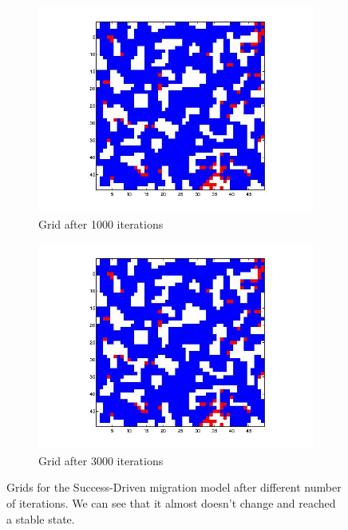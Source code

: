 \documentclass[11pt]{article}
\begin{document}
\begin{figure}
	\centering
	\begin{subfigure}[t]{0.4\textwidth}
        \includegraphics[width=\textwidth]{../../other/grids/m2-t1000.jpg}
	\caption{Grid after 1000 iterations}
    	\end{subfigure}
	\begin{subfigure}[t]{0.4\textwidth}
        \includegraphics[width=\textwidth]{../../other/grids/m2-t3000.jpg}
	\caption{Grid after 3000 iterations}
    	\end{subfigure}

	\caption{Grids for the Success-Driven migration model after different number of iterations. We can see that it almost doesn't change and reached a stable state.}
	\label{fig:grids_stable}
\end{figure}
\end{document}
